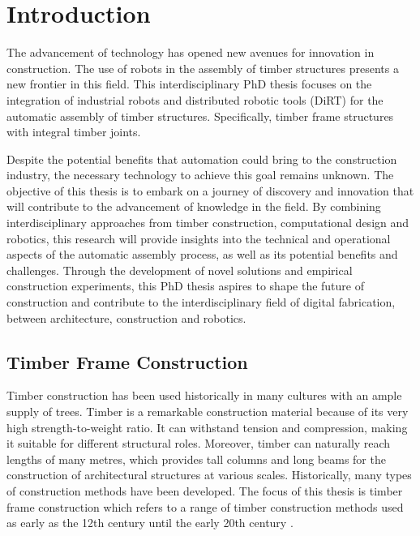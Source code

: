 \chapter{Introduction}
\label{chapter:introduction}

The advancement of technology has opened new avenues for innovation in construction.
The use of robots in the assembly of timber structures presents a new frontier in this field.
This interdisciplinary PhD thesis focuses on the integration of industrial robots and distributed robotic tools (DiRT) for the automatic assembly of timber structures.
Specifically, timber frame structures with integral timber joints. 

Despite the potential benefits that automation could bring to the construction industry, the necessary technology to achieve this goal remains unknown. The objective of this thesis is to embark on a journey of discovery and innovation that will contribute to the advancement of knowledge in the field.
By combining interdisciplinary approaches from timber construction, computational design and robotics, this research will provide insights into the technical and operational aspects of the automatic assembly process, as well as its potential benefits and challenges.
Through the development of novel solutions and empirical construction experiments, this PhD thesis aspires to shape the future of construction and contribute to the interdisciplinary field of digital fabrication, between architecture, construction and robotics.

\section{Timber Frame Construction}
\label{section:introduction-timber-frame-construction}

Timber construction has been used historically in many cultures with an ample supply of trees.
Timber is a remarkable construction material because of its very high strength-to-weight ratio.
It can withstand tension and compression, making it suitable for different structural roles. Moreover, timber can naturally reach lengths of many metres, which provides tall columns and long beams for the construction of architectural structures at various scales.
Historically, many types of construction methods have been developed. The focus of this thesis is timber frame construction which refers to a range of timber construction methods used as early as the 12th century until the early 20th century \parencite{sobonTimberFrameConstruction1984}.

